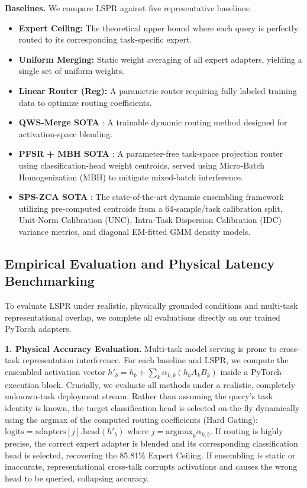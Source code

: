 \textbf{Baselines.} We compare LSPR against five representative baselines:
\begin{itemize}
    \item \textbf{Expert Ceiling:} The theoretical upper bound where each query is perfectly routed to its corresponding task-specific expert.
    \item \textbf{Uniform Merging:} Static weight averaging of all expert adapters, yielding a single set of uniform weights.
    \item \textbf{Linear Router (Reg):} A parametric router requiring fully labeled training data to optimize routing coefficients.
    \item \textbf{QWS-Merge SOTA} \cite{adamerging2023}: A trainable dynamic routing method designed for activation-space blending.
    \item \textbf{PFSR + MBH SOTA} \cite{pfsr2025}: A parameter-free task-space projection router using classification-head weight centroids, served using Micro-Batch Homogenization (MBH) to mitigate mixed-batch interference.
    \item \textbf{SPS-ZCA SOTA} \cite{sps_zca2025}: The state-of-the-art dynamic ensembling framework utilizing pre-computed centroids from a 64-sample/task calibration split, Unit-Norm Calibration (UNC), Intra-Task Dispersion Calibration (IDC) variance metrics, and diagonal EM-fitted GMM density models.
\end{itemize}

\subsection{Empirical Evaluation and Physical Latency Benchmarking}
\label{subsec:exp_analytical_models}

To evaluate LSPR under realistic, physically grounded conditions and multi-task representational overlap, we complete all evaluations directly on our trained PyTorch adapters.

\textbf{1. Physical Accuracy Evaluation.} Multi-task model serving is prone to cross-task representation interference. For each baseline and LSPR, we compute the ensembled activation vector $h'_b = h_b + \sum_k \alpha_{k, b} (h_b A_k B_k)$ inside a PyTorch execution block. Crucially, we evaluate all methods under a realistic, completely unknown-task deployment stream. Rather than assuming the query's task identity is known, the target classification head is selected on-the-fly dynamically using the argmax of the computed routing coefficients (Hard Gating): $\text{logits} = \text{adapters}[j].\text{head}(h'_b)$ where $j = \text{argmax}_k \alpha_{k, b}$. If routing is highly precise, the correct expert adapter is blended and its corresponding classification head is selected, recovering the 85.81\% Expert Ceiling. If ensembling is static or inaccurate, representational cross-talk corrupts activations and causes the wrong head to be queried, collapsing accuracy.

